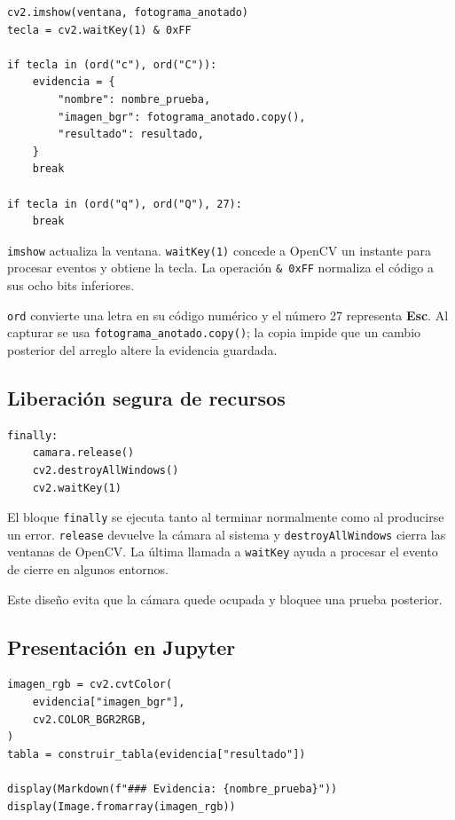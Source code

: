\documentclass[11pt,a4paper]{article}
\begin{document}
\begin{lstlisting}
cv2.imshow(ventana, fotograma_anotado)
tecla = cv2.waitKey(1) & 0xFF

if tecla in (ord("c"), ord("C")):
    evidencia = {
        "nombre": nombre_prueba,
        "imagen_bgr": fotograma_anotado.copy(),
        "resultado": resultado,
    }
    break

if tecla in (ord("q"), ord("Q"), 27):
    break
\end{lstlisting}

\texttt{imshow} actualiza la ventana. \texttt{waitKey(1)} concede a OpenCV un
instante para procesar eventos y obtiene la tecla. La operación
\texttt{\& 0xFF} normaliza el código a sus ocho bits inferiores.

\texttt{ord} convierte una letra en su código numérico y el número 27
representa \textbf{Esc}. Al capturar se usa
\texttt{fotograma\_anotado.copy()}; la copia impide que un cambio posterior
del arreglo altere la evidencia guardada.

\subsection{Liberación segura de recursos}

\begin{lstlisting}
finally:
    camara.release()
    cv2.destroyAllWindows()
    cv2.waitKey(1)
\end{lstlisting}

El bloque \texttt{finally} se ejecuta tanto al terminar normalmente como al
producirse un error. \texttt{release} devuelve la cámara al sistema y
\texttt{destroyAllWindows} cierra las ventanas de OpenCV. La última llamada a
\texttt{waitKey} ayuda a procesar el evento de cierre en algunos entornos.

Este diseño evita que la cámara quede ocupada y bloquee una prueba posterior.

\subsection{Presentación en Jupyter}

\begin{lstlisting}
imagen_rgb = cv2.cvtColor(
    evidencia["imagen_bgr"],
    cv2.COLOR_BGR2RGB,
)
tabla = construir_tabla(evidencia["resultado"])

display(Markdown(f"### Evidencia: {nombre_prueba}"))
display(Image.fromarray(imagen_rgb))
\end{lstlisting}
\end{document}
